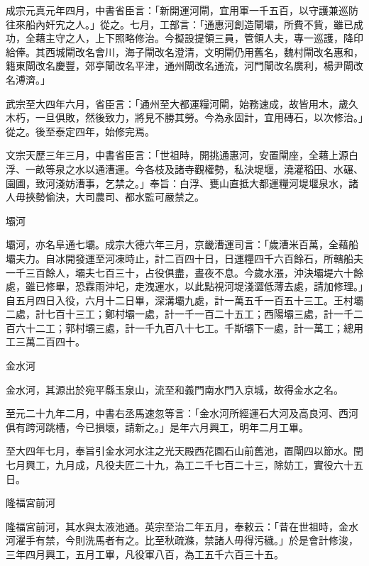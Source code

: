\begin{pinyinscope}
 成宗元真元年四月，中書省臣言：「新開運河閘，宜用軍一千五百，以守護兼巡防往來船內奸宄之人。」從之。七月，工部言：「通惠河創造閘壩，所費不貲，雖已成功，全藉主守之人，上下照略修治。今擬設提領三員，管領人夫，專一巡護，降印給俸。其西城閘改名會川，海子閘改名澄清，文明閘仍用舊名，魏村閘改名惠和，籍東閘改名慶豐，郊亭閘改名平津，通州閘改名通流，河門閘改名廣利，楊尹閘改名溥濟。」



 武宗至大四年六月，省臣言：「通州至大都運糧河閘，始務速成，故皆用木，歲久木朽，一旦俱敗，然後致力，將見不勝其勞。今為永固計，宜用磚石，以次修治。」從之。後至泰定四年，始修完焉。



 文宗天歷三年三月，中書省臣言：「世祖時，開挑通惠河，安置閘座，全藉上源白浮、一畝等泉之水以通漕運。今各枝及諸寺觀權勢，私決堤堰，澆灌稻田、水碾、園圃，致河淺妨漕事，乞禁之。」奉旨：白浮、甕山直抵大都運糧河堤堰泉水，諸人毋挾勢偷決，大司農司、都水監可嚴禁之。



 壩河



 壩河，亦名阜通七壩。成宗大德六年三月，京畿漕運司言：「歲漕米百萬，全藉船壩夫力。自冰開發運至河凍時止，計二百四十日，日運糧四千六百餘石，所轄船夫一千三百餘人，壩夫七百三十，占役俱盡，晝夜不息。今歲水漲，沖決壩堤六十餘處，雖已修畢，恐霖雨沖圮，走洩運水，以此點視河堤淺澀低薄去處，請加修理。」自五月四日入役，六月十二日畢，深溝壩九處，計一萬五千一百五十三工。王村壩二處，計七百十三工；鄭村壩一處，計一千一百二十五工；西陽壩三處，計一千二百六十二工；郭村壩三處，計一千九百八十七工。千斯壩下一處，計一萬工；總用工三萬二百四十。



 金水河



 金水河，其源出於宛平縣玉泉山，流至和義門南水門入京城，故得金水之名。



 至元二十九年二月，中書右丞馬速忽等言：「金水河所經運石大河及高良河、西河俱有跨河跳槽，今已損壞，請新之。」是年六月興工，明年二月工畢。



 至大四年七月，奉旨引金水河水注之光天殿西花園石山前舊池，置閘四以節水。閏七月興工，九月成，凡役夫匠二十九，為工二千七百二十三，除妨工，實役六十五日。



 隆福宮前河



 隆福宮前河，其水與太液池通。英宗至治二年五月，奉敕云：「昔在世祖時，金水河濯手有禁，今則洗馬者有之。比至秋疏滌，禁諸人毋得污穢。」於是會計修浚，三年四月興工，五月工畢，凡役軍八百，為工五千六百三十五。




\end{pinyinscope}
